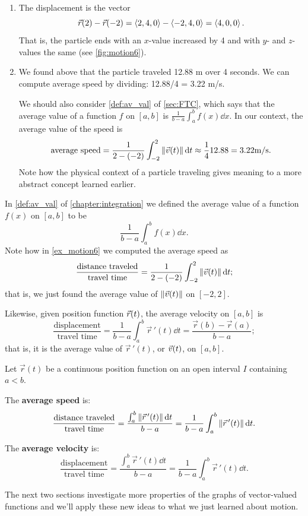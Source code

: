 \begin{example}
\begin{enumerate}
	\item	The displacement is the vector
	\[\vec r(2)-\vec r(-2) =\left\langle 2,4,0\right\rangle-\left\langle -2,4,0\right\rangle=\left\langle 4,0,0\right\rangle.\]
	That is, the particle ends with an $x$-value increased by 4 and with $y$- and $z$-values the same (see \autoref{fig:motion6}).
	
	\item	We found above that the particle traveled 12.88 m over 4 seconds. We can compute average speed by dividing: 12.88/4 = 3.22 m/s. 
	
	We should also consider \autoref{def:av_val} of \autoref{sec:FTC}, which says that the average value of a function $f$ on $[a,b]$ is $\frac{1}{b-a}\int_a^b f(x)\dd x$. In our context, the average value of the speed is
	\[
	\text{average speed} = \frac{1}{2-(-2)}\int_{-2}^2 \left\lVert \vec v(t) \right\rVert\operatorname{d}\! t \approx \frac14 12.88 = 3.22\text{m/s}.
	\]
	Note how the physical context of a particle traveling gives meaning to a more abstract concept learned earlier.
\end{enumerate}
\end{example}

In \autoref{def:av_val} of \autoref{chapter:integration} we defined the average value of a function $f(x)$ on $[a,b]$ to be
\[\frac{1}{b-a}\int_a^bf(x)\dd x.\]
Note how in \autoref{ex_motion6} we computed the average speed as
\[\frac{\text{distance traveled}}{\text{travel time}} = \frac1{2-(-2)}\int_{-2}^2\left\lVert \vec v(t) \right\rVert\operatorname{d}\! t;\]
that is, we just found the average value of $\left\lVert \vec v(t) \right\rVert$ on $[-2,2]$.

Likewise, given position function $\vec r(t)$, the average velocity on $[a,b]$ is
\[\frac{\text{displacement}}{\text{travel time}} = \frac1{b-a}\int_a^b \vec{r}\,'(t)\dd t = \frac{\vec r(b)-\vec r(a)}{b-a};\]
that is, it is the average value of $\vec r\,'(t)$, or $\vec v(t)$, on $[a,b]$.

\begin{keyidea}\label{idea:average_speed_velocity}%
Let $\vec r(t)$ be a continuous position function on an open interval $I$ containing $a<b$.\bigskip

The \textbf{average speed} is:
\[\frac{\text{distance traveled}}{\text{travel time}} = \frac{\int_a^b \left\lVert \vec{r}\,'(t) \right\rVert\operatorname{d}\! t}{b-a} = \frac1{b-a}\int_a^b\left\lVert \vec{r}\,'(t) \right\rVert\operatorname{d}\! t.\]

The \textbf{average velocity} is:
\[\frac{\text{displacement}}{\text{travel time}} = \frac{\int_a^b \vec{r}\,'(t)\dd t}{b-a} = \frac1{b-a}\int_a^b\vec{r}\,'(t)\dd t.\]
\end{keyidea}

The next two sections investigate more properties of the graphs of vector-valued functions and we'll apply these new ideas to what we just learned about motion.

